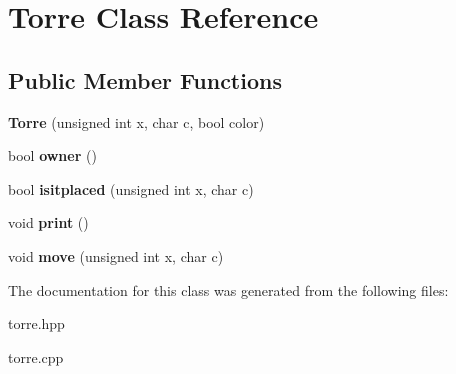 \hypertarget{classTorre}{\section{Torre Class Reference}
\label{classTorre}
}
\subsection*{Public Member Functions}
\begin{DoxyCompactItemize}
\item 
\hypertarget{classTorre_aabeb5d073fae40e2d7b9d2cef24300fa}{{\bfseries Torre} (unsigned int x, char c, bool color)}\label{classTorre_aabeb5d073fae40e2d7b9d2cef24300fa}

\item 
\hypertarget{classTorre_a17fb741ba3618be9c052621ca8eaf2bc}{bool {\bfseries owner} ()}\label{classTorre_a17fb741ba3618be9c052621ca8eaf2bc}

\item 
\hypertarget{classTorre_ae3cda890039c46156775b81dacd3a38e}{bool {\bfseries isitplaced} (unsigned int x, char c)}\label{classTorre_ae3cda890039c46156775b81dacd3a38e}

\item 
\hypertarget{classTorre_a6dce584895c3e05189dc9ec916fd873f}{void {\bfseries print} ()}\label{classTorre_a6dce584895c3e05189dc9ec916fd873f}

\item 
\hypertarget{classTorre_afa7c4455bf0f3ebda8f79a4ce8e5f189}{void {\bfseries move} (unsigned int x, char c)}\label{classTorre_afa7c4455bf0f3ebda8f79a4ce8e5f189}

\end{DoxyCompactItemize}


The documentation for this class was generated from the following files\-:\begin{DoxyCompactItemize}
\item 
torre.\-hpp\item 
torre.\-cpp\end{DoxyCompactItemize}
